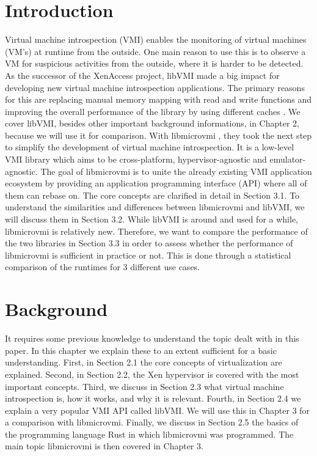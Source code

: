\documentclass[sigconf]{acmart}
\begin{document}
\section{Introduction}
Virtual machine introspection (VMI) enables the monitoring of virtual machines (VM's) at runtime from the outside.
One main reason to use this is to observe a VM for suspicious activities from the outside, where it is harder to be detected.
\newline
\newline
As the successor of the XenAccess project, libVMI made a big impact for developing new virtual machine introspection applications. The primary reasons for this are replacing manual memory mapping with read and write functions and improving the overall performance of the library by using different caches \cite{payne2012simplifying}. We cover libVMI, besides other important background informations, in Chapter 2, because we will use it for comparison.
\newline
\newline 
With libmicrovmi \cite{githublibmicrovmi}, they took the next step to simplify the development of virtual machine introspection. It is a low-level VMI library which aims to be cross-platform, hypervisor-agnostic and emulator-agnostic. The goal of libmicrovmi is to unite the already existing VMI application ecosystem by providing an application programming interface (API) where all of them can rebase on. The core concepts are clarified in detail in Section 3.1.
\newline
\newline
To understand the similarities and differences between libmicrovmi and libVMI, we will discuss them in Section 3.2.
While libVMI is around and used for a while, libmicrovmi is relatively new. Therefore, we want to compare the performance of the two libraries in Section 3.3 in order to assess whether the performance of libmicrovmi is sufficient in practice or not. This is done through a statistical comparison of the runtimes for 3 different use cases.

\section{Background}
It requires some previous knowledge to understand the topic dealt with in this paper. In this chapter we explain these to an extent sufficient for a basic understanding. 
First, in Section 2.1 the core concepts of virtualization are explained. 
Second, in Section 2.2, the Xen hypervisor is covered with the most important concepts.
Third, we discuss in Section 2.3 what virtual machine introspection is, how it works, and why it is relevant.
Fourth, in Section 2.4 we explain a very popular VMI API called libVMI. We will use this in Chapter 3 for a comparison with libmicrovmi.
Finally, we discuss in Section 2.5 the basics of the programming language Rust in which libmicrovmi was programmed.
The main topic libmicrovmi is then covered in Chapter 3.
\end{document}
